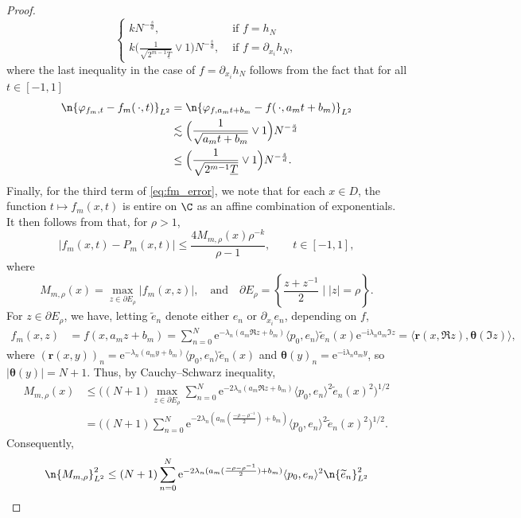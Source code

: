 \documentclass[a4paper, 11pt, headings = small, abstract]{scrartcl}
\begin{document}
\begin{proof}
\[\begin{cases}
			kN^{-\frac{s}{d}}, &\text{ if }f=h_N\\
			k\big(\frac{1}{\sqrt{2^{m-1}\underline{T}}}\vee1\big)N^{-\frac{s}{d}}, &\text{ if }f=\partial_{x_i}h_N,
		\end{cases}
	\]
	where the last inequality in the case of $f=\partial_{x_i}h_N$ follows from the fact that for all $t\in[-1, 1]$
	\begin{align*}
		\n{\varphi_{f_m, t}-f_m(\,\cdot, t)}_{L^2}
		&=\n{\varphi_{f,a_mt+b_m}-f(\,\cdot, a_mt+b_m)}_{L^2} \\
		&\lesssim\Big(\frac{1}{\sqrt{a_mt+b_m}}\vee1\Big)N^{-\frac{s}{d}} \\
		&\le\Big(\frac{1}{\sqrt{2^{m-1}\underline{T}}}\vee1\Big)N^{-\frac{s}{d}}.
	\end{align*}
	Finally, for the third term of \eqref{eq:fm_error}, we note that for each $x\in D$, the function $t\mapsto f_m(x, t)$ is entire on $\C$ as an affine combination of exponentials.
	It then follows from \cite[Theorem 8.2]{trefethen13} that, for $\rho>1$,
	\[
		|f_m(x, t)-P_m(x, t)|
		\le\frac{4M_{m, \rho}(x)\rho^{-k}}{\rho-1},\qquad t\in[-1, 1],
	\]
	where
	\[
		M_{m, \rho}(x)
		=\max_{z\in \partial E_\rho}|f_m(x, z)|,\quad\text{and}\quad
		\partial E_\rho
		=\left\{\frac{z+z^{-1}}{2}\mid |z|=\rho\right\}.
	\]
	For $z\in\partial E_\rho$, we have, letting $\widetilde{e}_n$ denote either $e_n$ or $\partial_{x_i}e_n$, depending on $f$,
	\begin{align*}
		f_m(x, z)
		&=f(x, a_mz+b_m)
		=\sum_{n=0}^{N}\mathrm{e}^{-\lambda_n(a_m\Re{z}+b_m)}\langle p_0, e_n\rangle \widetilde{e}_n(x)\mathrm{e}^{-\mathrm{i}\lambda_n a_m\Im z}
		=\langle \bm{r}(x, \Re z), \bm{\theta}(\Im z)\rangle,
	\end{align*}
	where $(\bm{r}(x,  y))_{n}=\mathrm{e}^{-\lambda_n(a_my+b_m)}\langle p_0, e_n\rangle \widetilde{e}_n(x)$ and $\bm{\theta}(y)_{n}=\mathrm{e}^{-\mathrm{i}\lambda_n a_m y}$, so $\lvert \bm{\theta}(y)\rvert = N+1$.
	Thus, by Cauchy--Schwarz inequality,
	\begin{align*}
		M_{m, \rho}(x)
		&\le \bigg((N+1)\max_{z\in\partial E_\rho}\sum_{n=0}^{N}\mathrm{e}^{-2\lambda_n(a_m\Re{z}+b_m)}\langle p_0, e_n\rangle^2\widetilde{e}_n(x)^2\bigg)^{1/2} \\
		&=\bigg((N+1)\sum_{n=0}^{N}\mathrm{e}^{-2\lambda_n(a_m(\frac{-\rho-\rho^{-1}}{2})+b_m)}\langle p_0, e_n\rangle^2\widetilde{e}_n(x)^2\bigg)^{1/2}.
	\end{align*}
	Consequently,
	\begin{align*}
		\n{M_{m,\rho}}_{L^2}^2
		&\le(N+1)\sum_{n=0}^{N}\mathrm{e}^{-2\lambda_n(a_m(\frac{-\rho-\rho^{-1}}{2})+b_m)}\langle p_0, e_n\rangle^2\n{\widetilde{e}_n}_{L^2}^2 \\

\end{align*}
\end{proof}
\end{document}
